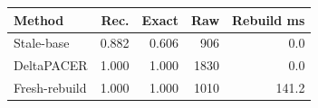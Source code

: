 \begin{tabular}{lrrrr}
\toprule
Method & Rec. & Exact & Raw & Rebuild ms\\
\midrule
Stale-base & 0.882 & 0.606 & 906 & 0.0\\
DeltaPACER & 1.000 & 1.000 & 1830 & 0.0\\
Fresh-rebuild & 1.000 & 1.000 & 1010 & 141.2\\
\bottomrule
\end{tabular}
